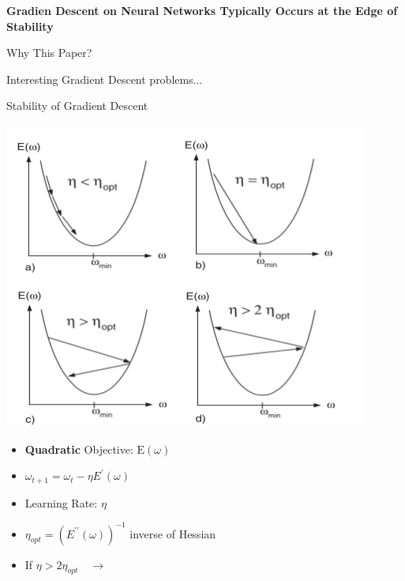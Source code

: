 \documentclass[aspectratio=169]{beamer}
\author{\authorlabel}
\newcommand{\mysubtitle}{\color{Pink}\Large{\textbf{Gradien Descent on Neural Networks Typically Occurs at the Edge of Stability}}}
\begin{document}



\begin{frame}
	\centering
	\mysubtitle\cite{Cohen2021}
\end{frame}

\begin{frame}{Why This Paper?}
	\centering
	\begin{minipage}{0.8\textwidth}
			\centering
			 Interesting Gradient Descent problems...
	\end{minipage}
\end{frame}

\begin{frame}{Stability of Gradient Descent}
	\begin{minipage}{0.5\textwidth}
    \centering
    \includegraphics[width=0.9\textwidth]{Figures/GD.png}\cite{Orr1998}
	\end{minipage}%
	\begin{minipage}{0.5\textwidth}
    \begin{itemize}
      \item \textbf{Quadratic} Objective: $\text{E}(\omega)$
      \item $\omega_{t+1} = \omega_{t} - \eta E^\prime(\omega)$
      \item Learning Rate: $\eta$
      \item $\eta_{opt}=(E^{\prime\prime}(\omega))^{-1}$ inverse of Hessian
      \item If $\eta>2\eta_{opt}\quad\to$ \color{Pink}{Divergence}
    \end{itemize}
	\end{minipage}
\end{frame}
\end{document}
